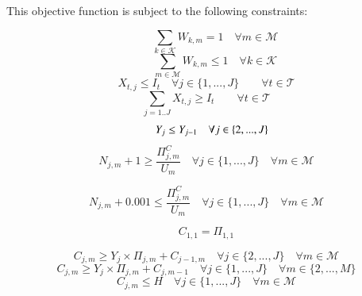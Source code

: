 \documentclass[review,12pt, 3p, times]{elsarticle}
\begin{document}
This objective function is subject to the following constraints:
\begin{spacing}{.5}	
	\begin{equation}
		\begin{array}{ll}		
			  &   
		\end{array}
		{{\sum_{k\in \mathcal{K}}W_{k,m}}=1 \quad \forall{ m \in  \mathcal{M}}}
		\label{c3}
	\end{equation}
	\begin{equation}
		\begin{array}{ll}
			  &   
		\end{array}
		{{\sum_{m\in \mathcal{M}}W_{k,m}}\leq 1 \quad \forall{ k \in  \mathcal{K}}}
		\label{c4}
	\end{equation}
	\begin{equation}\label{c6}
		X_{t,j}  \leq I_t  \quad\forall j \in \{1,...,J\} \quad \quad\forall{t\in\mathcal{T}}
	\end{equation} 
	\begin{equation}\label{c7}
		{{\sum_{j=1..J} X_{t,j} }   \geq I_t   \quad \quad\forall{t\in\mathcal{T}}}
	\end{equation} 
	\begin{equation}\label{c8}
		\text{\quad }  Y_j\leq Y_{j-1} \quad\forall j \in \{2,...,J\}
	\end{equation}									 
	\begin{equation}\label{c9} 
		N_{j,m} +1 \geq \frac{\Pi^C_{j,m}}{U_m}  \quad\forall j \in \{1,...,J\}  \quad\forall m\in\mathcal{M}
	\end{equation}
											
	\begin{equation}\label{c10} 
		N_{j,m}  + 0.001  \leq \frac{\Pi^C_{j,m}}{U_m}  \quad\forall j \in \{1,...,J\} \quad\forall m\in\mathcal{M}
	\end{equation}
											 
	\begin{equation}\label{c11}
		C_{1,1} = \Pi_{1,1} 
	\end{equation}
																				
	\begin{equation}\label{c12}
		C_{j,m} \geq Y_j\times\Pi_{j,m}+C_{j-1,m}\quad\forall j \in \{2,...,J\}\quad\forall{m\in\mathcal{M}}
	\end{equation} 
	\begin{equation}\label{c13}
		C_{j,m} \geq Y_j\times\Pi_{j,m}+C_{j,m-1}  \quad\forall j \in \{1,...,J\} \quad\forall m \in \{2, ..., M\}
	\end{equation} 			
	\begin{equation}\label{c14}
		C_{j,m} \leq H\quad\forall j \in \{1,...,J\}\quad\forall{ m \in\mathcal{M}} 
	\end{equation} 						
\end{spacing}
	
\end{document}
